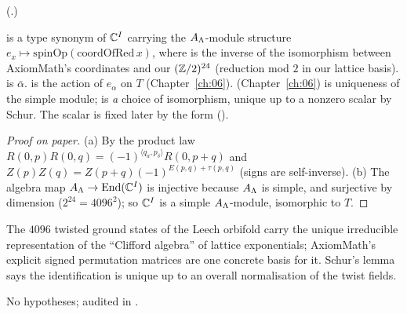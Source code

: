 (.)
\begin{dictionary}
 is a type synonym of ${\mathbb{C}}^I$ carrying the $A_{\Lambda}$-module structure
$e_x\mapsto\mathrm{spinOp}(\mathrm{coordOfRed}\,x)$, where  is the inverse of the
isomorphism  between AxiomMath's coordinates and our $({\mathbb{Z}}/2)^{24}$ (reduction mod $2$ in
our lattice basis).   is $\bar\alpha$.   is the action of $e_\alpha$ on $T$
(Chapter~\ref{ch:06}).   (Chapter~\ref{ch:06}) is uniqueness of the simple
module;  is \emph{a} choice of isomorphism, unique up to a nonzero scalar by Schur.  The
scalar is fixed later by the form ().
\end{dictionary}
\begin{proof}[Proof on paper]
(a) By the product law $R(0,p)R(0,q)=(-1)^{\langle q_a,p_\delta\rangle}R(0,p+q)$ and
$Z(p)Z(q)=Z(p+q)(-1)^{E(p,q)+\tau(p,q)}$ (signs are self-inverse).  (b) The algebra map
$A_{\Lambda}\to\operatorname{End}({\mathbb{C}}^I)$ is injective because $A_{\Lambda}$ is simple, and surjective by dimension
($2^{24}=4096^2$); so ${\mathbb{C}}^I$ is a simple $A_{\Lambda}$-module, isomorphic to $T$.
\end{proof}
\begin{physics}
The $4096$ twisted ground states of the Leech orbifold carry the unique irreducible representation of
the ``Clifford algebra'' of lattice exponentials; AxiomMath's explicit signed permutation matrices are
one concrete basis for it.  Schur's lemma says the identification is unique up to an overall
normalisation of the twist fields.
\end{physics}
\begin{status}
No hypotheses; audited in .
\end{status}

